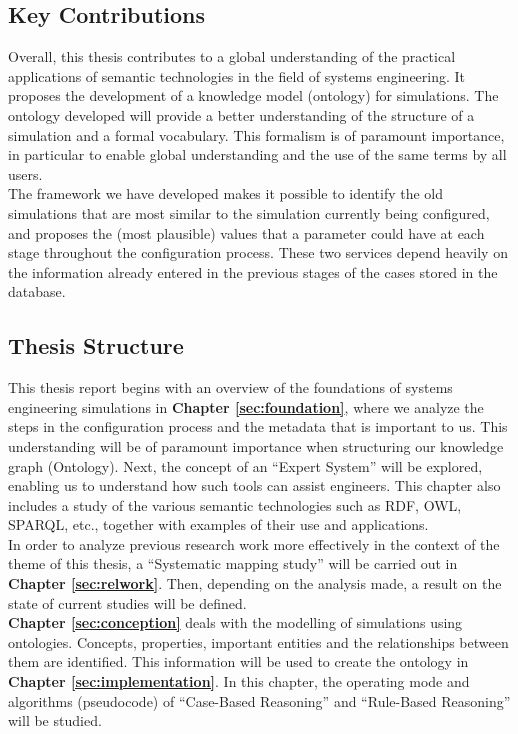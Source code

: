 \subsection{Key Contributions}
Overall, this thesis contributes to a global understanding of the practical applications of semantic technologies in the field of systems engineering. It proposes the development of a knowledge model (ontology) for simulations. The ontology developed will provide a better understanding of the structure of a simulation and a formal vocabulary. This formalism is of paramount importance, in particular to enable global understanding and the use of the same terms by all users.\\

The framework we have developed makes it possible to identify the old simulations that are most similar to the simulation currently being configured, and proposes the (most plausible) values that a parameter could have at each stage throughout the configuration process. These two services depend heavily on the information already entered in the previous stages of the cases stored in the database.


\subsection{Thesis Structure}
This thesis report begins with an overview of the foundations of systems engineering simulations in \textbf{Chapter \ref{sec:foundation}}, where we analyze the steps in the configuration process and the metadata that is important to us. This understanding will be of paramount importance when structuring our knowledge graph (Ontology). Next, the concept of an “Expert System” will be explored, enabling us to understand how such tools can assist engineers. This chapter also includes a study of the various semantic technologies such as RDF, OWL, SPARQL, etc., together with examples of their use and applications. \\

In order to analyze previous research work more effectively in the context of the theme of this thesis, a “Systematic mapping study” will be carried out in \textbf{Chapter \ref{sec:relwork}}. Then, depending on the analysis made, a result on the state of current studies will be defined.\\

\textbf{Chapter \ref{sec:conception}} deals with the modelling of simulations using ontologies. Concepts, properties, important entities and the relationships between them are identified. This information will be used to create the ontology in \textbf{Chapter \ref{sec:implementation}}. In this chapter, the operating mode and algorithms (pseudocode) of “Case-Based Reasoning” and “Rule-Based Reasoning” will be studied. \\

